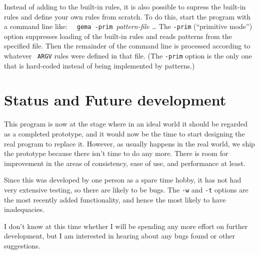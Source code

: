 Instead of adding to the built-in rules, it is also possible to supress
the built-in rules and define your own rules from scratch.  To do this,
start the program with a command line like:\newline
\verb|  gema -prim |{\em pattern-file  \ldots}
\newline
The \verb/-prim/ (``primitive mode'') option suppresses loading of the
built-in rules and reads patterns from the specified file.  Then the
remainder of the command line is processed according to whatever {\tt
ARGV} rules were defined in that file.
(The \verb/-prim/ option is the only one that is hard-coded instead of
being implemented by patterns.)

\section{Status and Future development}

This program is now at the stage where in an ideal world it should be
regarded as a completed prototype, and it would now be the time to start
designing the real program to replace it.  However, as usually happens
in the real world, we ship the prototype because there isn't time to do
any more.  There is room for improvement in the areas of consistency,
ease of use, and performance at least.

Since this was developed by one person as a spare time hobby, it has not
had very extensive testing, so there are likely to be bugs.  The
\verb/-w/ and \verb/-t/ options are the most recently added
functionality, and hence the most likely to have inadequacies.

I don't know at this time whether I will be spending any more effort on
further development, but I am interested in hearing about any bugs found
or other suggestions.

